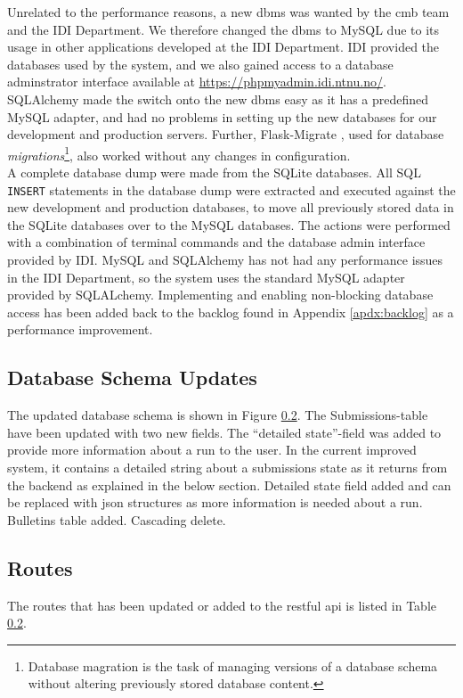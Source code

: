 Unrelated to the performance reasons, a new \gls{dbms} was wanted by the \gls{cmb} team and the IDI Department. We therefore changed the \gls{dbms} to MySQL due to its usage in other applications developed at the IDI Department. IDI provided the databases used by the system, and we also gained access to a database adminstrator interface available at \url{https://phpmyadmin.idi.ntnu.no/}. SQLAlchemy made the switch onto the new \gls{dbms} easy as it has a predefined MySQL adapter, and had no problems in setting up the new databases for our development and production servers. Further, Flask-Migrate \cite{FLASKMIGRATE}, used for database \textit{migrations}\footnote{Database magration is the task of managing versions of a database schema without altering previously stored database content.}, also worked without any changes in configuration. \\

A complete database dump were made from the SQLite databases. All SQL \texttt{INSERT} statements in the database dump were extracted and executed against the new development and production databases, to move all previously stored data in the SQLite databases over to the MySQL databases. The actions were performed with a combination of terminal commands and the database admin interface provided by IDI. MySQL and SQLAlchemy has not had any performance issues in the IDI Department, so the system uses the standard MySQL adapter provided by SQLALchemy. Implementing and enabling non-blocking database access has been added back to the backlog found in Appendix \ref{apdx:backlog} as a performance improvement.

\subsection{Database Schema Updates}
The updated database schema is shown in Figure \ref{}. The Submissions-table have been updated with two new fields. The ``detailed state''-field was added to provide more information about a run to the user. In the current improved system, it contains a detailed string about a submissions state as it returns from the backend as explained in the below section. 
Detailed state field added and can be replaced with json structures as more information is needed about a run.
Bulletins table added. Cascading delete.

\subsection{Routes}
The routes that has been updated or added to the \gls{rest}ful \gls{api} is listed in Table \ref{}.

